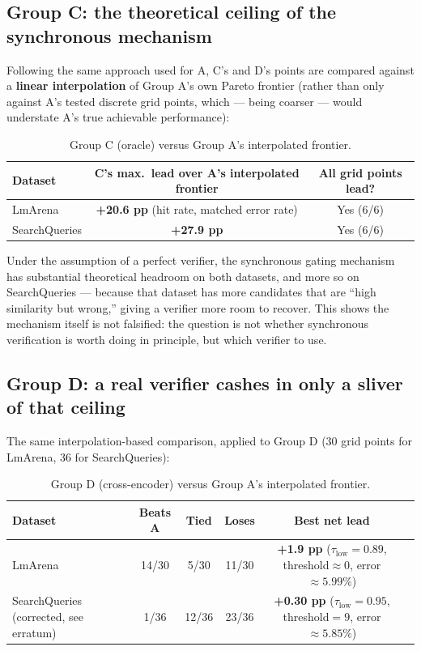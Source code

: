 \documentclass[11pt]{article}
\newcommand{\taulow}{\ensuremath{\tau_{\text{low}}}}
\newenvironment{fittab}{\begin{lrbox}{\fittabbox}}{\end{lrbox}%
  \ifdim\wd\fittabbox>\linewidth\resizebox{\linewidth}{!}{\usebox{\fittabbox}}\else\usebox{\fittabbox}\fi}
\begin{document}
\subsection{Group C: the theoretical ceiling of the synchronous mechanism}
\label{sec:groupc}

Following the same approach used for A, C's and D's points are compared against a \textbf{linear interpolation} of Group A's own Pareto frontier (rather than only against A's tested discrete grid points, which --- being coarser --- would understate A's true achievable performance):

\begin{table}[h]
\centering
\small
\begin{fittab}\begin{tabular}{@{}lcc@{}}
\toprule
\textbf{Dataset} & \textbf{C's max.\ lead over A's interpolated frontier} & \textbf{All grid points lead?} \\
\midrule
LmArena & \textbf{+20.6 pp} (hit rate, matched error rate) & Yes (6/6) \\
SearchQueries & \textbf{+27.9 pp} & Yes (6/6) \\
\bottomrule
\end{tabular}\end{fittab}
\caption{Group C (oracle) versus Group A's interpolated frontier.}
\end{table}

Under the assumption of a perfect verifier, the synchronous gating mechanism has substantial theoretical headroom on both datasets, and more so on SearchQueries --- because that dataset has more candidates that are ``high similarity but wrong,'' giving a verifier more room to recover. This shows the mechanism itself is not falsified: the question is not whether synchronous verification is worth doing in principle, but which verifier to use.

\subsection{Group D: a real verifier cashes in only a sliver of that ceiling}
\label{sec:groupd}

The same interpolation-based comparison, applied to Group D (30 grid points for LmArena, 36 for SearchQueries):

\begin{table}[h]
\centering
\small
\begin{fittab}\begin{tabular}{@{}lccccc@{}}
\toprule
\textbf{Dataset} & \textbf{Beats A} & \textbf{Tied} & \textbf{Loses} & \textbf{Best net lead} \\
\midrule
LmArena & 14/30 & 5/30 & 11/30 & \textbf{+1.9 pp} ($\taulow{=}0.89$, threshold$\approx 0$, error$\approx 5.99\%$) \\
SearchQueries (corrected, see erratum) & 1/36 & 12/36 & 23/36 & \textbf{+0.30 pp} ($\taulow{=}0.95$, threshold$=9$, error$\approx 5.85\%$) \\
\bottomrule
\end{tabular}\end{fittab}
\caption{Group D (cross-encoder) versus Group A's interpolated frontier.}
\end{table}
\end{document}
